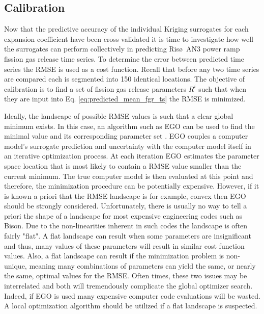 \subsection{Calibration}
\label{\subsec:calibration}

Now that the predictive accuracy of the individual Kriging surrogates for each expansion coefficient have been cross validated it is time to investigate how well the surrogates can perform collectively in predicting Ris\o~AN3 power ramp fission gas release time series. To determine the error between predicted time series the \ac{RMSE} is used as a cost function. Recall that before any two time series are compared each is segmented into 150 identical locations. The objective of calibration is to find a set of fission gas release parameters $R^i$ such that when they are input into Eq. \ref{eq:predicted_mean_fgr_ts} the \ac{RMSE} is minimized. 

Ideally, the landscape of possible \ac{RMSE} values is such that a clear global minimum exists. In this case, an algorithm such as \ac{EGO} can be used to find the minimal value and its corresponding parameter set \cite{Jones_Schonlau}. \ac{EGO} couples a computer model's surrogate prediction and uncertainty with the computer model itself in an iterative optimization process.  At each iteration \ac{EGO} estimates the parameter space location that is most likely to contain a \ac{RMSE} value smaller than the current minimum. The true computer model is then evaluated at this point and therefore, the minimization procedure can be potentially expensive. However, if it is known a priori that the \ac{RMSE} landscape is for example, convex then \ac{EGO} should be strongly considered. Unfortunately, there is usually no way to tell a priori the shape of a landscape for most expensive engineering codes such as Bison. Due to the non-linearities inherent in such codes the landscape is often fairly "flat". A flat landscape can result when some parameters are insignificant and thus, many values of these parameters will result in similar cost function values. Also, a flat landscape can result if the minimization problem is non-unique, meaning many combinations of parameters can yield the same, or nearly the same, optimal values for the \ac{RMSE}. Often times, these two issues may be interrelated and both will tremendously complicate the global optimizer search. Indeed, if \ac{EGO} is used many expensive computer code evaluations will be wasted. A local optimization algorithm should be utilized if a flat landscape is suspected.  

